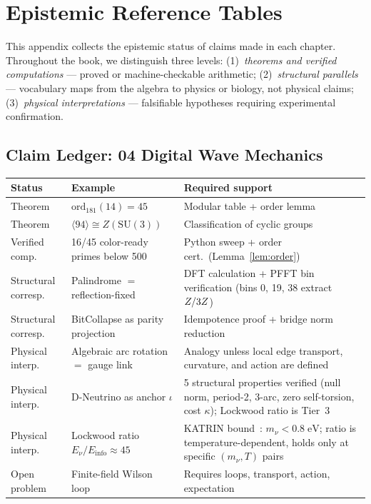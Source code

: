 \chapter{Epistemic Reference Tables}\label{app:claim_ledgers}

This appendix collects the epistemic status of claims made in each chapter. Throughout the book, we distinguish three levels: (1)~\emph{theorems and verified computations} --- proved or machine-checkable arithmetic; (2)~\emph{structural parallels} --- vocabulary maps from the algebra to physics or biology, not physical claims; (3)~\emph{physical interpretations} --- falsifiable hypotheses requiring experimental confirmation.

\section*{Claim Ledger: 04 Digital Wave Mechanics}
\begin{center}
{\small
\begin{tabular}{@{}llp{5.5cm}@{}}
\toprule
\textbf{Status} & \textbf{Example} & \textbf{Required support} \\
\midrule
Theorem & $\mathrm{ord}_{181}(14) = 45$ & Modular table + order lemma \\
Theorem & $\langle 94 \rangle \cong Z(\mathrm{SU}(3))$ & Classification of cyclic groups \\
Verified comp. & 16/45 color-ready primes below 500 & Python sweep + order cert.\ (Lemma~\ref{lem:order}) \\
Structural corresp. & Palindrome $=$ reflection-fixed & DFT calculation + PFFT bin verification (bins 0, 19, 38 extract $Z/3Z$) \\
Structural corresp. & BitCollapse as parity projection & Idempotence proof + bridge norm reduction \\
Physical interp. & Algebraic arc rotation $=$ gauge link & Analogy unless local edge transport, curvature, and action are defined \\
Physical interp. & D-Neutrino as anchor $\iota$ & 5 structural properties verified (null norm, period-2, 3-arc, zero self-torsion, cost $\kappa$); Lockwood ratio is Tier~3 \\
Physical interp. & Lockwood ratio $E_\nu/E_{\mathrm{info}} \approx 45$ & KATRIN bound~\cite{katrin}: $m_\nu < 0.8\;\mathrm{eV}$; ratio is temperature-dependent, holds only at specific $(m_\nu, T)$ pairs \\
Open problem & Finite-field Wilson loop & Requires loops, transport, action, expectation \\
\bottomrule
\end{tabular}
}
\end{center}

